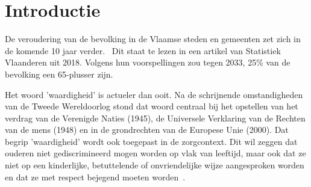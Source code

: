 

\section{Introductie}\label{sec:introductie} %

De veroudering van de bevolking in de Vlaamse steden en gemeenten zet zich in de komende 10 jaar verder.~\autocite{StatistiekVlaanderen2018} Dit staat te lezen in een artikel van Statistiek Vlaanderen uit 2018.
Volgens hun voorspellingen zou tegen 2033, 25\% van de bevolking een 65-plusser zijn.~\autocite{StatistiekVlaanderen2018}

Het woord 'waardigheid' is actueler dan ooit.
Na de schrijnende omstandigheden van de Tweede Wereldoorlog stond dat woord centraal bij het opstellen van het verdrag van de Verenigde Naties (1945), de Universele Verklaring van de Rechten van de mens (1948) en in de grondrechten van de Europese Unie (2000).
Dat begrip 'waardigheid' wordt ook toegepast in de zorgcontext.
Dit wil zeggen dat ouderen niet gediscrimineerd mogen worden op vlak van leeftijd, maar ook dat ze niet op een kinderlijke, betuttelende of onvriendelijke wijze aangesproken worden en dat ze met respect bejegend moeten worden~\autocite{Campens}.

